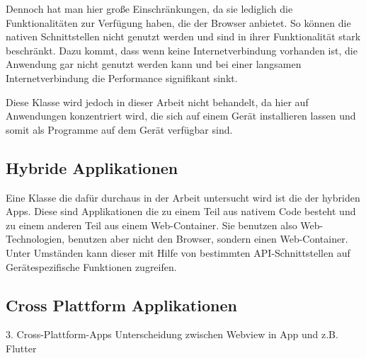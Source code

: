 Dennoch hat man hier große Einschränkungen, da sie lediglich die Funktionalitäten zur Verfügung haben, die der Browser anbietet. So können die nativen Schnittstellen nicht genutzt werden und sind in ihrer Funktionalität stark beschränkt. Dazu kommt, dass wenn keine Internetverbindung vorhanden ist, die Anwendung gar nicht genutzt werden kann und bei einer langsamen Internetverbindung die Performance signifikant sinkt. 

Diese Klasse wird jedoch in dieser Arbeit nicht behandelt, da hier auf Anwendungen konzentriert wird, die sich auf einem Gerät installieren lassen und somit als Programme auf dem Gerät verfügbar sind.

\subsection{Hybride Applikationen}
Eine Klasse die dafür durchaus in der Arbeit untersucht wird ist die der hybriden Apps. Diese sind Applikationen die zu einem Teil aus nativem Code besteht und zu einem anderen Teil aus einem Web-Container. Sie benutzen also Web-Technologien, benutzen aber nicht den Browser, sondern einen Web-Container. Unter Umständen kann dieser mit Hilfe von bestimmten API-Schnittstellen auf Gerätespezifische Funktionen zugreifen.\cite{IEEE_development_classes}


\subsection{Cross Plattform Applikationen}
3. Cross-Plattform-Apps
Unterscheidung zwischen Webview in App und z.B. Flutter 
